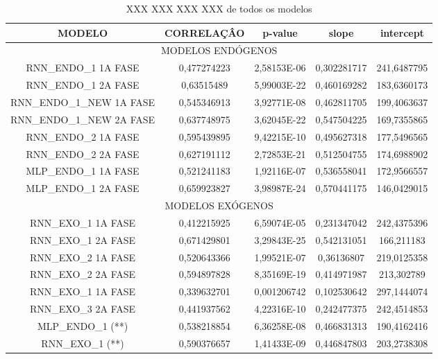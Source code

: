 \documentclass[	12pt, Times, openright, twoside, a4paper, english, brazil]{abntex2}
\begin{document}
\begin{table}[!ht]
        \caption{XXX XXX XXX  XXX de todos os modelos}
        \begin{adjustbox}{width=\columnwidth,center}
           \begin{tabular}{ | c | c| c | c| c |}
     \rowcolor{gray!50}
   {	MODELO} & CORRELAÇÂO &	p-value &	slope & 	intercept\\ \hline
     \multicolumn{5}{c}{	MODELOS ENDÓGENOS }  \\ \hline
RNN\_ENDO\_1 1A FASE &	0,477274223	&2,58153E-06&	0,302281717&241,6487795 \\ \hline
RNN\_ENDO\_1 2A FASE&	0,63515489&	5,99003E-22&	0,460169282&	183,6360173\\ \hline
RNN\_ENDO\_1\_NEW 1A FASE&	0,545346913	&3,92771E-08&	0,462811705&	199,4063637\\ \hline
RNN\_ENDO\_1\_NEW 2A FASE&	0,637748975&	3,62045E-22	&0,547504225&	169,7355865\\ \hline
RNN\_ENDO\_2 1A FASE&	0,595439895&	9,42215E-10	&0,495627318&	177,5496565\\ \hline
RNN\_ENDO\_2 2A FASE&	0,627191112&2,72853E-21&	0,512504755	&174,6988902\\ \hline
MLP\_ENDO\_1 1A FASE&	0,521241183	&1,92116E-07&	0,536558041	&172,9566557\\ \hline
MLP\_ENDO\_1 2A FASE&	0,659923827	&3,98987E-24&	0,570441175&	146,0429015\\ \hline
	\multicolumn{5}{c}{ MODELOS EXÓGENOS }\\ \hline
RNN\_EXO\_1 1A FASE &	0,412215925&	6,59074E-05&	0,231347042&	242,4375396 \\ \hline
RNN\_EXO\_1 2A FASE &	0,671429801	&3,29843E-25&	0,542131051&	166,211183 \\ \hline
RNN\_EXO\_2 1A FASE&	0,520643366	&1,99521E-07&	0,36136807&	219,0125358 \\ \hline
RNN\_EXO\_2 2A FASE&	0,594897828&8,35169E-19&	0,414971987&	213,302789 \\ \hline
RNN\_EXO\_1 1A FASE&	0,339632701&	0,001206742	&0,102530642&	297,1444074 \\ \hline
RNN\_EXO\_3 2A FASE&	0,441937562&	4,22316E-10&	0,242477375	&242,4514853 \\ \hline
MLP\_ENDO\_1 (**)&	0,538218854	&6,36258E-08&	0,466831313&190,4162416 \\ \hline
RNN\_EXO\_1  (**)&	0,590376657	&1,41433E-09&	0,446847803	&203,2738308 \\ \hline
\end{tabular} \end{adjustbox} \end{table} 
\end{document}
